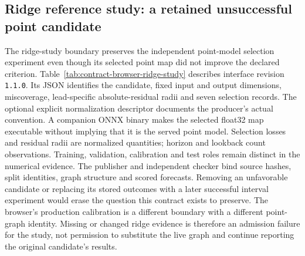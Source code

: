 \subsection{Ridge reference study: a retained unsuccessful point candidate}
\label{sec:contract-browser-ridge-study}
The ridge-study boundary preserves the independent point-model selection experiment even though its selected point map did not improve the declared criterion. Table~\ref{tab:contract-browser-ridge-study} describes interface revision \texttt{1.1.0}. Its JSON identifies the candidate, fixed input and output dimensions, miscoverage, lead-specific absolute-residual radii and seven selection records. The optional explicit normalization descriptor documents the producer's actual convention. A companion ONNX binary makes the selected float32 map executable without implying that it is the served point model. Selection losses and residual radii are normalized quantities; horizon and lookback count observations. Training, validation, calibration and test roles remain distinct in the numerical evidence. The publisher and independent checker bind source hashes, split identities, graph structure and scored forecasts. Removing an unfavorable candidate or replacing its stored outcomes with a later successful interval experiment would erase the question this contract exists to preserve. The browser's production calibration is a different boundary with a different point-graph identity. Missing or changed ridge evidence is therefore an admission failure for the study, not permission to substitute the live graph and continue reporting the original candidate's results.


